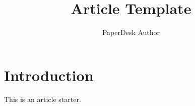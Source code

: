 \documentclass{article}
\title{Article Template}
\author{PaperDesk Author}
\begin{document}
\maketitle
\section{Introduction}
This is an article starter.
\end{document}
